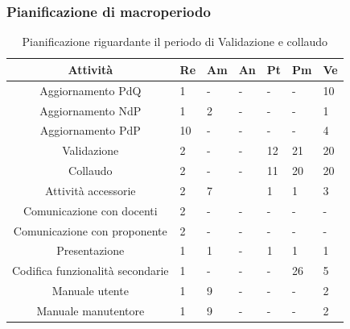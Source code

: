 \subsubsection{Pianificazione di macroperiodo}
\begin{table}[H]
	\centering
	\renewcommand{\arraystretch}{1.5}
	\begin{tabular}{|c|p{10mm}|p{10mm}|p{10mm}|p{10mm}|p{10mm}|p{10mm}|}
		\hline
		\rowcolor{lighter-grayer}
		Attività & Re & Am & An & Pt & Pm & Ve \\ \hline
		Aggiornamento PdQ                                                           & 1           &    -         &      -       &     -        &     -        & 10          \\ \hline
		Aggiornamento NdP                                                           & 1           & 2           &    -         &     -        &      -       & 1           \\ \hline
		Aggiornamento PdP                                                           & 10          &     -        &    -         &     -        &    -         & 4           \\ \hline
		Validazione                                                                 & 2           &   -          &       -      & 12          & 21          & 20          \\ \hline
		Collaudo                                                                    & 2           &     -        &     -        & 11          & 20          & 20          \\ \hline
		Attività accessorie & 2           & 7           &             & 1           & 1           & 3           \\ \hline
		Comunicazione con docenti                                                   & 2           &     -        &      -       &     -        &      -       &     -        \\ \hline
		Comunicazione con proponente                                                & 2           &    -         &       -      &   -          &     -        &    -         \\ \hline
		Presentazione                                                               & 1           & 1           &    -         & 1           & 1           & 1           \\ \hline
		Codifica funzionalità secondarie                                            & 1           &    -         &      -       &    -        & 26          & 5           \\ \hline
		Manuale utente                                                              & 1           & 9           &     -        &    -         &     -        & 2           \\ \hline
		Manuale manutentore                                                         & 1           & 9           &      -       &      -       &     -        & 2           \\ \hline
	\end{tabular}
	\caption{ Pianificazione riguardante il periodo di Validazione e collaudo\\}
\end{table}

